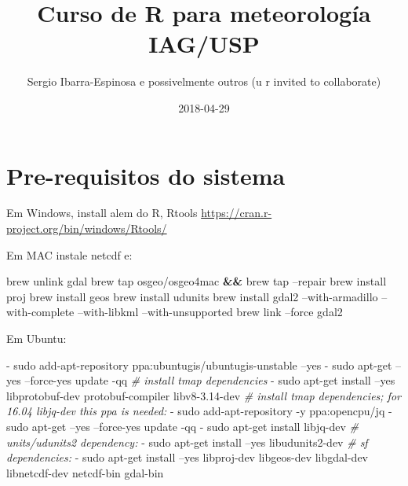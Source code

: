 \documentclass[]{book}
\title{Curso de R para meteorología IAG/USP}
\author{Sergio Ibarra-Espinosa e possivelmente outros (u r invited to
collaborate)}
\date{2018-04-29}
\newenvironment{Shaded}{\begin{snugshade}}{\end{snugshade}}
\newcommand{\KeywordTok}[1]{\textcolor[rgb]{0.13,0.29,0.53}{\textbf{#1}}}
\newcommand{\CommentTok}[1]{\textcolor[rgb]{0.56,0.35,0.01}{\textit{#1}}}
\newcommand{\ExtensionTok}[1]{#1}
\newcommand{\NormalTok}[1]{#1}
\theoremstyle{definition}
\theoremstyle{definition}
\theoremstyle{definition}
\theoremstyle{remark}
\begin{document}
\maketitle

{
\setcounter{tocdepth}{1}
\tableofcontents
}
\chapter{Pre-requisitos do sistema}\label{primero}

Em Windows, install alem do R, Rtools
\url{https://cran.r-project.org/bin/windows/Rtools/}

Em MAC instale netcdf e:

\begin{Shaded}
\begin{Highlighting}[]
\ExtensionTok{brew}\NormalTok{ unlink gdal}
\ExtensionTok{brew}\NormalTok{ tap osgeo/osgeo4mac }\KeywordTok{&&} \ExtensionTok{brew}\NormalTok{ tap --repair}
\ExtensionTok{brew}\NormalTok{ install proj}
\ExtensionTok{brew}\NormalTok{ install geos}
\ExtensionTok{brew}\NormalTok{ install udunits}
\ExtensionTok{brew}\NormalTok{ install gdal2 --with-armadillo --with-complete --with-libkml --with-unsupported}
\ExtensionTok{brew}\NormalTok{ link --force gdal2}
\end{Highlighting}
\end{Shaded}

Em Ubuntu:

\begin{Shaded}
\begin{Highlighting}[]
  \ExtensionTok{-}\NormalTok{ sudo add-apt-repository ppa:ubuntugis/ubuntugis-unstable --yes}
  \ExtensionTok{-}\NormalTok{ sudo apt-get --yes --force-yes update -qq}
  \CommentTok{# install tmap dependencies}
  \ExtensionTok{-}\NormalTok{ sudo apt-get install --yes libprotobuf-dev protobuf-compiler libv8-3.14-dev}
  \CommentTok{# install tmap dependencies; for 16.04 libjq-dev this ppa is needed:}
  \ExtensionTok{-}\NormalTok{ sudo add-apt-repository -y ppa:opencpu/jq}
  \ExtensionTok{-}\NormalTok{ sudo apt-get --yes --force-yes update -qq}
  \ExtensionTok{-}\NormalTok{ sudo apt-get install libjq-dev}
  \CommentTok{# units/udunits2 dependency:}
  \ExtensionTok{-}\NormalTok{ sudo apt-get install --yes libudunits2-dev}
  \CommentTok{# sf dependencies:}
  \ExtensionTok{-}\NormalTok{ sudo apt-get install --yes libproj-dev libgeos-dev libgdal-dev libnetcdf-dev  netcdf-bin gdal-bin}
\end{Highlighting}
\end{Shaded}
\end{document}
